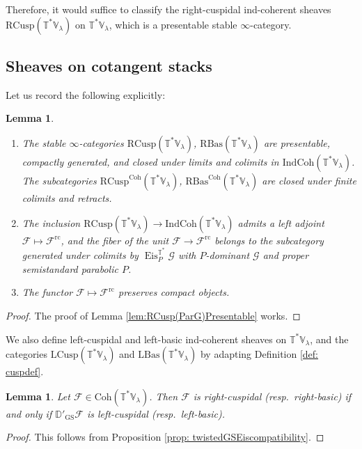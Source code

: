 \documentclass{amsart}
\newtheorem{lemma}[theorem]{Lemma}
\theoremstyle{definition}
\theoremstyle{remark}
\numberwithin{equation}{section}
\newcommand{\mc}{\mathcal}
\newcommand{\D}{\mathbb{D}}
\newcommand{\IndCoh}{\mathrm{IndCoh}}
\DeclareMathOperator{\Eis}{\mathrm{Eis}}
\newcommand{\Coh}{\mathrm{Coh}}
\newcommand{\LCusp}{\mathrm{LCusp}}
\newcommand{\RCusp}{\mathrm{RCusp}}
\newcommand{\GS}{\mathrm{GS}}
\newcommand{\rc}{\mathrm{rc}}
\newcommand{\V}{\mathbb{V}}
\newcommand{\T}{\mathbb{T}}
\newcommand{\RBas}{\mathrm{RBas}}
\newcommand{\LBas}{\mathrm{LBas}}
\begin{document}
Therefore, it would suffice to classify the right-cuspidal ind-coherent sheaves $\RCusp(\T^*\V_\lambda)$ on $\T^*\V_\lambda$, which is a presentable stable $\infty$-category.

\subsection{Sheaves on cotangent stacks}

Let us record the following explicitly:

\begin{lemma}\label{lem:RCusp(TV)Presentable}
\begin{enumerate}
    \item The stable $\infty$-categories $\RCusp(\T^*\V_\lambda)$, $\RBas(\T^*\V_\lambda)$ are presentable, compactly generated, and closed under limits and colimits in $\IndCoh(\T^*\V_\lambda)$. The subcategories $\RCusp^\Coh(\T^*\V_\lambda)$, $\RBas^\Coh(\T^*\V_\lambda)$ are closed under finite colimits and retracts. 
    \item The inclusion $\RCusp(\T^*\V_\lambda)\to \IndCoh(\T^*\V_\lambda)$ admits a left adjoint $\mc F\mapsto \mc F^\rc$, and the fiber of the unit $\mc F\to \mc F^\rc$
    belongs to the subcategory generated under colimits by $\Eis_{P}^{\T^*} \mc{G}$ with $P$-dominant $\mc{G}$ and proper semistandard parabolic $P$. 
    \item The functor $\mc{F} \mapsto \mc F^\rc$ preserves compact objects. 
\end{enumerate}
\end{lemma}

\begin{proof}
The proof of Lemma \ref{lem:RCusp(ParG)Presentable} works. 
\end{proof}

We also define left-cuspidal and left-basic ind-coherent sheaves on $\T^*\V_\lambda$, and the categories $\LCusp(\T^*\V_\lambda)$ and $\LBas(\T^*\V_\lambda)$ by adapting Definition \ref{def: cuspdef}.

\begin{lemma}\label{lem: Cotangentleftrightcuspidality}
Let $\mc F\in \Coh(\T^* \V_{\lambda})$. Then $\mc F$ is right-cuspidal (resp.~right-basic) if and only if $\D'_{\GS}\mc F$ is left-cuspidal (resp.~left-basic). 
\end{lemma}

\begin{proof}
    This follows from Proposition \ref{prop: twistedGSEiscompatibility}.
\end{proof}
\end{document}

